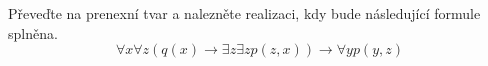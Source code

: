 Převeďte na prenexní tvar a nalezněte realizaci, kdy bude následující formule
splněna.
$$\forall x \forall z (q(x) \rightarrow \exists z \exists z p(z,x)) \rightarrow
\forall y p(y,z)$$
